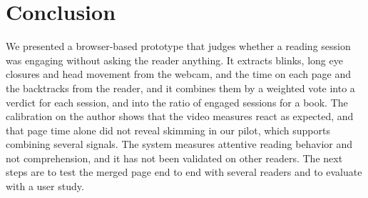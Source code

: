 \documentclass[sigconf,nonacm]{acmart}
\begin{document}
\section{Conclusion}\label{sec:conclusion}
We presented a browser-based prototype that judges whether a reading session was engaging without asking the reader
anything. It extracts blinks, long eye closures and head movement from the webcam, and the time on each page and the
backtracks from the reader, and it combines them by a weighted vote into a verdict for each session, and into the ratio of
engaged sessions for a book. The calibration on the author shows that the video measures react as expected, and that
page time alone did not reveal skimming in our pilot, which supports combining several signals. The system measures attentive
reading behavior and not comprehension, and it has not been validated on other readers. The next steps are to test the
merged page end to end with several readers and to evaluate with a user study.



\end{document}
